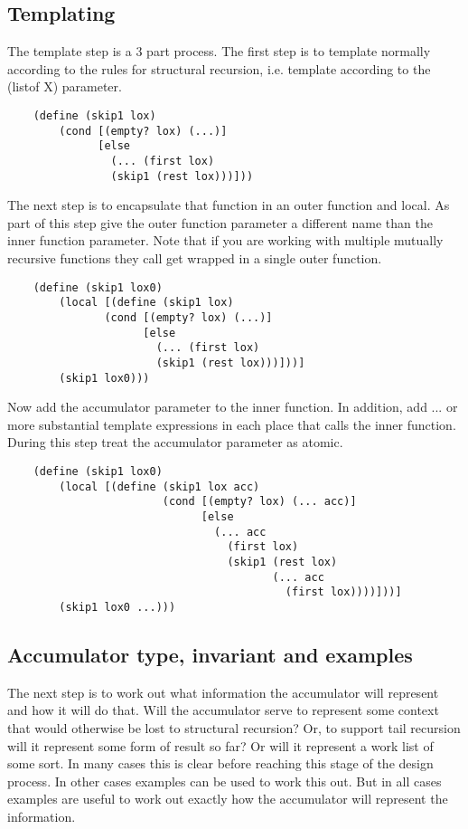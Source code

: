 \documentclass[11pt,a4paper]{report}
\begin{document}
	\subsection*{Templating}
	The template step is a 3 part process. The first step is to template normally according to the rules
	for structural recursion, i.e. template according to the (listof X) parameter.
	
	\begin{verbatim}
	(define (skip1 lox)
		(cond [(empty? lox) (...)]
		      [else
		        (... (first lox)
		        (skip1 (rest lox)))]))
	\end{verbatim}
	
	The next step is to encapsulate that function in an outer function and local. As part of this step
	give the outer function parameter a different name than the inner function parameter. Note that if
	you are working with multiple mutually recursive functions they call get wrapped in a single outer
	function.
	
	\begin{verbatim}
	(define (skip1 lox0)
		(local [(define (skip1 lox)
		       (cond [(empty? lox) (...)]
		             [else
		               (... (first lox)
		               (skip1 (rest lox)))]))]
		(skip1 lox0)))
	\end{verbatim}
	
	Now add the accumulator parameter to the inner function. In addition, add ... or more substantial
	template expressions in each place that calls the inner function. During this step treat the
	accumulator parameter as atomic.
	
	\begin{verbatim}
	(define (skip1 lox0)
		(local [(define (skip1 lox acc)
		                (cond [(empty? lox) (... acc)]
		                      [else
		                        (... acc
		                          (first lox)
		                          (skip1 (rest lox)
		                                 (... acc 
		                                   (first lox))))]))]
		(skip1 lox0 ...)))
	\end{verbatim}
	
	\subsection*{Accumulator type, invariant and examples}
	The next step is to work out what information the accumulator will represent and how it will do
	that. Will the accumulator serve to represent some context that would otherwise be lost to
	structural recursion? Or, to support tail recursion will it represent some form of result so far? Or
	will it represent a work list of some sort. In many cases this is clear before reaching this stage of
	the design process. In other cases examples can be used to work this out. But in all cases
	examples are useful to work out exactly how the accumulator will represent the information.
	
\end{document}
